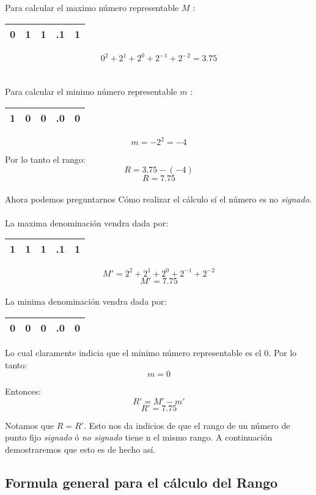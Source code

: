 Para calcular el maximo n\'umero representable $M$ :
\begin{center}
\begin{tabular}{ |ccccc| } 
 \hline
 0 & 1 & 1 & .1 & 1 \\ 
 \hline
\end{tabular}
\end{center}
$$ 0^2 + 2^1 + 2^0 +2^{-1} + 2^{-2}  = 3.75$$
\\\\
Para calcular el minimo n\'umero representable $m$ :
\begin{center}

\begin{tabular}{ |ccccc| } 
 \hline
 1 & 0 & 0 & .0 & 0 \\ 
 \hline
\end{tabular}
\end{center}
$$ m = -2^{2} = -4$$

Por lo tanto el rango: 
$$R = 3.75 - (-4 )$$ 
$$R = 7.75 $$
\\
\indent Ahora podemos preguntarnos  C\'omo realizar el c\'alculo s\'i el n\'umero es no \textit{signado}.
\\\\
La maxima denominaci\'on vendra dada por:
\begin{center}
\begin{tabular}{ |ccccc| } 
 \hline
 1 & 1 & 1 & .1 & 1 \\ 
 \hline
\end{tabular}
\end{center}

$$M' = 2^2 + 2^1 + 2^0 + 2^{-1} + 2^{-2}$$
$$M' = 7.75$$
\\
La minima denominaci\'on vendra dada por:
\begin{center}
\begin{tabular}{ |ccccc| } 
 \hline
 0 & 0 & 0 & .0 & 0 \\ 
 \hline
\end{tabular}
\end{center}

Lo cual claramente indicia que el minimo n\'umero representable es el $0$. Por lo tanto: $$m = 0$$




Entonces: 	$$R' = M' - m'$$
		 	$$R' = 7.75 $$
		 	
		 	
Notamos que $R = R'$. Esto nos da indicios de que el rango de un n\'umero de punto fijo \textit{signado} \'o \textit{no signado} tiene n el mismo rango. A continuaci\'on demostraremos que esto es de hecho as\'i.

\subsection{Formula general para el c\'alculo del Rango}



 
%


